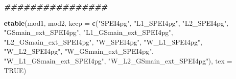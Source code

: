 \documentclass[
  a4paper,
]{article}
\newenvironment{Shaded}{\begin{snugshade}}{\end{snugshade}}
\newcommand{\AttributeTok}[1]{\textcolor[rgb]{0.13,0.29,0.53}{#1}}
\newcommand{\ConstantTok}[1]{\textcolor[rgb]{0.56,0.35,0.01}{#1}}
\newcommand{\DocumentationTok}[1]{\textcolor[rgb]{0.56,0.35,0.01}{\textbf{\textit{#1}}}}
\newcommand{\FunctionTok}[1]{\textcolor[rgb]{0.13,0.29,0.53}{\textbf{#1}}}
\newcommand{\NormalTok}[1]{#1}
\newcommand{\StringTok}[1]{\textcolor[rgb]{0.31,0.60,0.02}{#1}}
\begin{document}
\begin{Shaded}
\begin{Highlighting}[]
\DocumentationTok{\#\#\#\#\#\#\#\#\#\#\#\#\#\#\#\#}

\FunctionTok{etable}\NormalTok{(mod1, mod2, }\AttributeTok{keep =} \FunctionTok{c}\NormalTok{(}\StringTok{"SPEI4pg"}\NormalTok{, }\StringTok{"L1\_SPEI4pg"}\NormalTok{, }\StringTok{"L2\_SPEI4pg"}\NormalTok{, }\StringTok{"GSmain\_ext\_SPEI4pg"}\NormalTok{,}
    \StringTok{"L1\_GSmain\_ext\_SPEI4pg"}\NormalTok{, }\StringTok{"L2\_GSmain\_ext\_SPEI4pg"}\NormalTok{, }\StringTok{"W\_SPEI4pg"}\NormalTok{, }\StringTok{"W\_L1\_SPEI4pg"}\NormalTok{,}
    \StringTok{"W\_L2\_SPEI4pg"}\NormalTok{, }\StringTok{"W\_GSmain\_ext\_SPEI4pg"}\NormalTok{, }\StringTok{"W\_L1\_GSmain\_ext\_SPEI4pg"}\NormalTok{, }\StringTok{"W\_L2\_GSmain\_ext\_SPEI4pg"}\NormalTok{),}
    \AttributeTok{tex =} \ConstantTok{TRUE}\NormalTok{)}
\end{Highlighting}
\end{Shaded}
\end{document}
